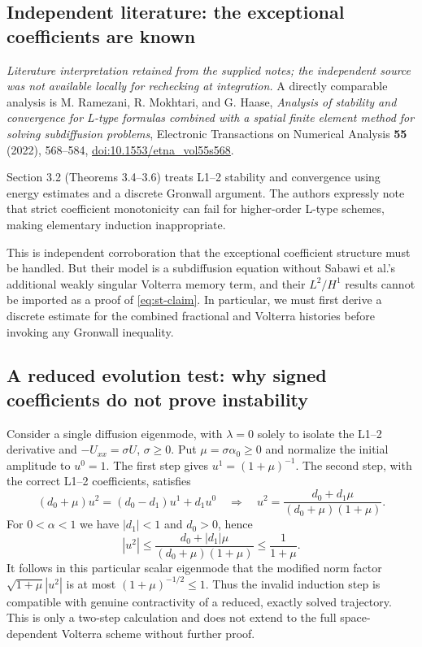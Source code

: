 \documentclass[11pt]{amsart}
\numberwithin{equation}{section}
\theoremstyle{remark}
\newcommand{\abs}[1]{\left\lvert #1\right\rvert}
\begin{document}
\subsection{Independent literature: the exceptional coefficients are known}
\textit{Literature interpretation retained from the supplied notes; the
independent source was not available locally for rechecking at integration.}
A directly comparable analysis is M. Ramezani, R. Mokhtari, and G. Haase,
\emph{Analysis of stability and convergence for L-type formulas combined
with a spatial finite element method for solving subdiffusion problems},
Electronic Transactions on Numerical Analysis \textbf{55} (2022), 568--584,
\href{https://doi.org/10.1553/etna_vol55s568}{doi:10.1553/etna\_vol55s568}.

Section 3.2 (Theorems 3.4--3.6) treats L1--2 stability and convergence using
energy estimates and a discrete Gronwall argument. The authors expressly
note that strict coefficient monotonicity can fail for higher-order L-type
schemes, making elementary induction inappropriate.

This is independent corroboration that the exceptional coefficient structure
must be handled. But their model is a subdiffusion equation without Sabawi
et al.'s additional weakly singular Volterra memory term, and their
$L^2/H^1$ results cannot be imported as a proof of \eqref{eq:st-claim}.
In particular, we must first derive a discrete estimate for the combined
fractional and Volterra histories before invoking any Gronwall inequality.

\subsection{A reduced evolution test: why signed coefficients do not prove instability}
Consider a single diffusion eigenmode, with $\lambda=0$ solely to isolate
the L1--2 derivative and $-U_{xx}=\sigma U$, $\sigma\geq0$.
Put $\mu=\sigma\alpha_0\geq0$ and normalize the initial amplitude to
$u^0=1$. The first step gives $u^1=(1+\mu)^{-1}$. The second step, with the
correct L1--2 coefficients, satisfies
\begin{equation}\label{eq:st-mode}
(d_0+\mu)u^2=(d_0-d_1)u^1+d_1u^0
\quad\Longrightarrow\quad
u^2=\frac{d_0+d_1\mu}{(d_0+\mu)(1+\mu)}.
\end{equation}
For $0<\alpha<1$ we have $\abs{d_1}<1$ and $d_0>0$, hence
\[
\abs{u^2}\leq\frac{d_0+\abs{d_1}\mu}{(d_0+\mu)(1+\mu)}
\leq\frac1{1+\mu}.
\]
It follows in this particular scalar eigenmode that the modified norm
factor $\sqrt{1+\mu}\abs{u^2}$ is at most $(1+\mu)^{-1/2}\leq1$.
Thus the invalid induction step is compatible with genuine contractivity
of a reduced, exactly solved trajectory. This is only a two-step calculation
and does not extend to the full space-dependent Volterra scheme without
further proof.
\end{document}
